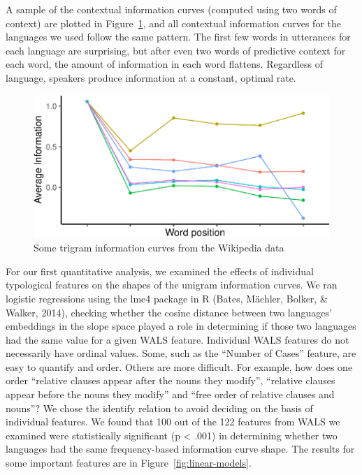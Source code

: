 \documentclass[man,floatsintext]{apa6}
\begin{document}
A sample of the contextual information curves (computed using two words of context) are plotted in Figure~\ref{fig:wiki-trigrams}, and all contextual information curves for the languages we used follow the same pattern. The first few words in utterances for each language are surprising, but after even two words of predictive context for each word, the amount of information in each word flattens. Regardless of language, speakers produce information at a constant, optimal rate.

\begin{figure}
\centering
\includegraphics{figs/wiki-trigrams-1.pdf}
\caption{\label{fig:wiki-trigrams}Some trigram information curves from the Wikipedia data}
\end{figure}

For our first quantitative analysis, we examined the effects of individual typological features on the shapes of the unigram information curves. We ran logistic regressions using the lme4 package in R (Bates, Mächler, Bolker, \& Walker, 2014), checking whether the cosine distance between two languages' embeddings in the slope space played a role in determining if those two languages had the same value for a given WALS feature. Individual WALS features do not necessarily have ordinal values. Some, such as the \enquote{Number of Cases} feature, are easy to quantify and order. Others are more difficult. For example, how does one order \enquote{relative clauses appear after the nouns they modify}, \enquote{relative clauses appear before the nouns they modify} and \enquote{free order of relative clauses and nouns}? We chose the identify relation to avoid deciding on the basis of individual features. We found that 100 out of the 122 features from WALS we examined were statistically significant (p \textless{} .001) in determining whether two languages had the same frequency-based information curve shape. The results for some important features are in Figure~\ref{fig:linear-models}.
\end{document}
